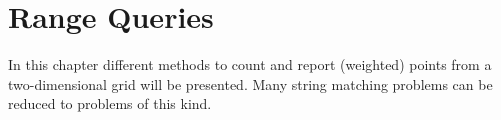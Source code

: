 \chapter{Range Queries}
\label{chp:rangeQueries}

In this chapter different methods to count and report (weighted) points from a two-dimensional grid will be presented. Many string matching problems can be reduced to problems of this kind.


